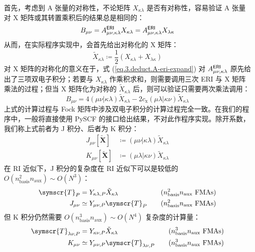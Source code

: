 首先，考虑到 A 张量的对称性，不论矩阵 $X_{\kappa \lambda}$ 是否有对称性，容易验证 A 张量对 X 矩阵或其转置乘积后的结果总是相同的：
\begin{equation*}
    B_{\mu \nu} = A_{\mu \nu, \kappa \lambda}^{\textsf{ERI}} X_{\kappa \lambda} = A_{\mu \nu, \kappa \lambda}^{\textsf{ERI}} X_{\lambda \kappa}
\end{equation*}
从而，在实际程序实现中，会首先给出对称化的 X 矩阵：
\begin{equation*}
    \tilde X_{\kappa \lambda} \coloneq \frac{1}{2} \left( X_{\kappa \lambda} + X_{\lambda \kappa} \right)
\end{equation*}
对 X 矩阵的对称化的意义在于，式 (\ref{eq.3.deduct.A-eri-expand}) 对 $A_{\mu \nu, \kappa \lambda}^{\textsf{ERI}}$ 原先给出了三项双电子积分；若要与 $X_{\kappa \lambda}$ 作乘积求和，则需要调用三次 ERI 与 X 矩阵乘法的过程；但当 X 矩阵化为对称的 $\tilde X_{\kappa \lambda}$ 后，则可以验证只需要两次乘法调用：
\begin{equation}
    \label{eq.3.A-contract-AO-JK}
    B_{\mu \nu} = 4 (\mu \nu | \kappa \lambda) \tilde X_{\kappa \lambda} - 2 c_\mathrm{x} (\mu \lambda | \kappa \nu) \tilde X_{\kappa \lambda}
\end{equation}
上式的计算过程与 Fock 矩阵中涉及双电子积分的计算过程完全一致。在我们的程序中，一般将直接使用 PySCF 的接口给出结果，不对此作程序实现。除开系数，我们称上式前者为 J 积分、后者为 K 积分：
\begin{align}
    \label{eq.3.def.J}
    J_{\mu \nu} [\tilde{\mathbf{X}}] &\coloneq (\mu \nu | \kappa \lambda) \tilde X_{\kappa \lambda} \\
    \label{eq.3.def.K}
    K_{\mu \nu} [\tilde{\mathbf{X}}] &\coloneq (\mu \lambda | \kappa \nu) \tilde X_{\kappa \lambda}
\end{align}
在 RI 近似下，J 积分的复杂度在 RI 近似下可以是较低的 $O(n_\mathrm{basis}^2 n_\mathrm{aux}) \sim O(N^3)$：
\begin{alignat*}{10}
    \symscr{T}_{P} &= Y_{\kappa \lambda, P} \tilde X_{\kappa \lambda} &&\quad (n_\mathrm{basis}^2 n_\mathrm{aux} \text{ FMAs}) \\
    J_{\mu \nu} &\simeq Y_{\mu \nu, P} \symscr{T}_P &&\quad (n_\mathrm{basis}^2 n_\mathrm{aux} \text{ FMAs})
\end{alignat*}
但 K 积分仍然需要 $O(n_\mathrm{basis}^3 n_\mathrm{aux}) \sim O(N^4)$ 复杂度的计算量：
\begin{alignat*}{10}
    \symscr{T}_{\lambda \nu, P} &= Y_{\kappa \nu, P} \tilde X_{\kappa \lambda} &&\quad (n_\mathrm{basis}^3 n_\mathrm{aux} \text{ FMAs}) \\
    K_{\mu \nu} &\simeq Y_{\mu \nu, P} \symscr{T}_{\lambda \nu, P} &&\quad (n_\mathrm{basis}^3 n_\mathrm{aux} \text{ FMAs})
\end{alignat*}
